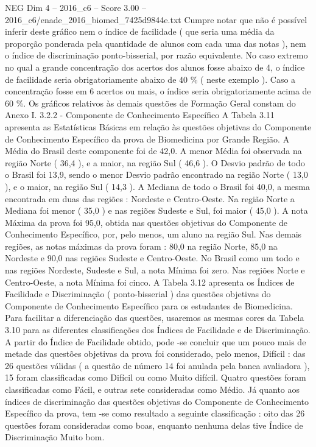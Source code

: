 \begin{textsample}{NEG Dim 4 – 2016\_c6 – Score 3.00 – 2016\_c6/enade\_2016\_biomed\_7425d9844e.txt}
Cumpre notar que não é possível inferir deste gráfico nem o índice de facilidade ( que seria uma média da proporção ponderada pela quantidade de alunos com cada uma das notas ), nem o índice de discriminação ponto-bisserial, por razão equivalente.
No caso extremo no qual a grande concentração dos acertos dos alunos fosse abaixo de 4, o índice de facilidade seria obrigatoriamente abaixo de 40 \% ( neste exemplo ).
Caso a concentração fosse em 6 acertos ou mais, o índice seria obrigatoriamente acima de 60 \%.
Os gráficos relativos às demais questões de Formação Geral constam do Anexo I. 3.2.2 - Componente de Conhecimento Específico A Tabela 3.11 apresenta as Estatísticas Básicas em relação às questões objetivas do Componente de Conhecimento Específico da prova de Biomedicina por Grande Região.
A Média do Brasil deste componente foi de 42,0.
A menor Média foi observada na região Norte ( 36,4 ), e a maior, na região Sul ( 46,6 ).
O Desvio padrão de todo o Brasil foi 13,9, sendo o menor Desvio padrão encontrado na região Norte ( 13,0 ), e o maior, na região Sul ( 14,3 ).
A Mediana de todo o Brasil foi 40,0, a mesma encontrada em duas das regiões : Nordeste e Centro-Oeste.
Na região Norte a Mediana foi menor ( 35,0 ) e nas regiões Sudeste e Sul, foi maior ( 45,0 ).
A nota Máxima da prova foi 95,0, obtida nas questões objetivas do Componente de Conhecimento Específico, por, pelo menos, um aluno na região Sul.
Nas demais regiões, as notas máximas da prova foram : 80,0 na região Norte, 85,0 na Nordeste e 90,0 nas regiões Sudeste e Centro-Oeste.
No Brasil como um todo e nas regiões Nordeste, Sudeste e Sul, a nota Mínima foi zero.
Nas regiões Norte e Centro-Oeste, a nota Mínima foi cinco.
A Tabela 3.12 apresenta os Índices de Facilidade e Discriminação ( ponto-bisserial ) das questões objetivas do Componente de Conhecimento Específico para os estudantes de Biomedicina.
Para facilitar a diferenciação das questões, usaremos as mesmas cores da Tabela 3.10 para as diferentes classificações dos Índices de Facilidade e de Discriminação.
A partir do Índice de Facilidade obtido, pode -se concluir que um pouco mais de metade das questões objetivas da prova foi considerado, pelo menos, Difícil : das 26 questões válidas ( a questão de número 14 foi anulada pela banca avaliadora ), 15 foram classificadas como Difícil ou como Muito difícil.
Quatro questões foram classificadas como Fácil, e outras sete consideradas como Médio.
Já quanto aos índices de discriminação das questões objetivas do Componente de Conhecimento Específico da prova, tem -se como resultado a seguinte classificação : oito das 26 questões foram consideradas como boas, enquanto nenhuma delas tive Índice de Discriminação Muito bom.

\end{textsample}

